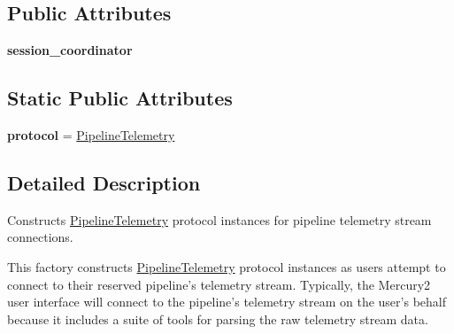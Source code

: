 \subsection*{Public Attributes}
\begin{DoxyCompactItemize}
\item 
\hypertarget{classhwm_1_1network_1_1protocols_1_1telemetry_1_1_pipeline_telemetry_factory_a614b91ff56fa652aa2d995b3a58d32fe}{{\bfseries session\-\_\-coordinator}}\label{classhwm_1_1network_1_1protocols_1_1telemetry_1_1_pipeline_telemetry_factory_a614b91ff56fa652aa2d995b3a58d32fe}

\end{DoxyCompactItemize}
\subsection*{Static Public Attributes}
\begin{DoxyCompactItemize}
\item 
\hypertarget{classhwm_1_1network_1_1protocols_1_1telemetry_1_1_pipeline_telemetry_factory_a927c379d6411805acdaf1b27b7dca700}{{\bfseries protocol} = \hyperlink{classhwm_1_1network_1_1protocols_1_1telemetry_1_1_pipeline_telemetry}{Pipeline\-Telemetry}}\label{classhwm_1_1network_1_1protocols_1_1telemetry_1_1_pipeline_telemetry_factory_a927c379d6411805acdaf1b27b7dca700}

\end{DoxyCompactItemize}


\subsection{Detailed Description}
Constructs \hyperlink{classhwm_1_1network_1_1protocols_1_1telemetry_1_1_pipeline_telemetry}{Pipeline\-Telemetry} protocol instances for pipeline telemetry stream connections. 

This factory constructs \hyperlink{classhwm_1_1network_1_1protocols_1_1telemetry_1_1_pipeline_telemetry}{Pipeline\-Telemetry} protocol instances as users attempt to connect to their reserved pipeline's telemetry stream. Typically, the Mercury2 user interface will connect to the pipeline's telemetry stream on the user's behalf because it includes a suite of tools for parsing the raw telemetry stream data. 

